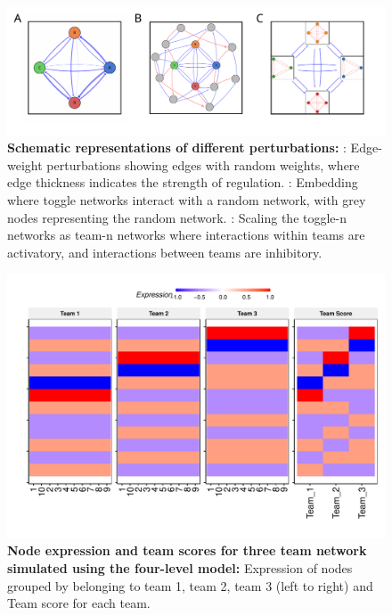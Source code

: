 \documentclass[11pt,a4paper]{article}
\theoremstyle{definition}
\theoremstyle{remark}
\begin{document}
\begin{figure}[h]
    \centering
    \begin{subfigure}[c]{\textwidth}
        \label{ew-schematic}
    \end{subfigure}
    \begin{subfigure}[c]{\textwidth}
        \label{embedding-schematic}
    \end{subfigure}
    \begin{subfigure}[c]{\textwidth}
        \label{teams-schematic}
    \end{subfigure}
    \includegraphics[width=\textwidth]{figures/FigureS4} 
    \caption{\textbf{Schematic representations of different perturbations:} : Edge-weight perturbations showing edges with random weights, where edge thickness indicates the strength of regulation. : Embedding where toggle networks interact with a random network, with grey nodes representing the random network. : Scaling the toggle-n networks as team-n networks where interactions within teams are activatory, and interactions between teams are inhibitory.}
    \label{schematic}
\end{figure}

\begin{figure}[h]
    \centering
    \includegraphics[width=\textwidth]{figures/FigureSX} 
    \caption{\textbf{Node expression and team scores for three team network simulated using the four-level model:} Expression of nodes grouped by belonging to team 1, team 2, team 3 (left to right) and Team score for each team.}
    \label{multlvl-expr}
\end{figure}
\end{document}
